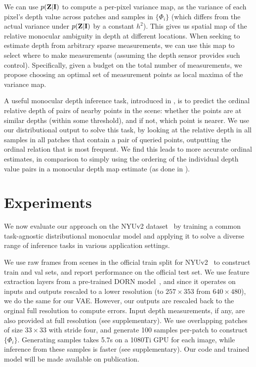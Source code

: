 \documentclass[10pt,twocolumn,letterpaper]{article}
\begin{document}
 We can use $p(\mathbf{Z}|\mathbf{I})$ to compute a per-pixel variance map,  as the variance of each pixel's depth value across patches and samples in $\{\Phi_i\}$ (which differs from the actual variance under $p(\mathbf{Z}|\mathbf{I})$ by a constant $h^2$). This gives us spatial map of the relative monocular ambiguity in depth at different locations. When seeking to estimate depth from arbitrary sparse measurements, we can use this map to select where to make measurements (assuming the depth sensor provides such control). Specifically, given a budget on the total number of measurements, we propose choosing an optimal set of measurement points as local maxima of the variance map.

 A useful monocular depth inference task, introduced in \cite{zoran2015learning}, is to predict the ordinal relative depth of pairs of nearby points in the scene: whether the points are at similar depths (within some threshold), and if not, which point is nearer. We use our distributional output to solve this task, by looking at the relative depth in all samples in all patches that contain a pair of queried points, outputting the ordinal relation that is most frequent. We find this leads to more accurate ordinal estimates, in comparison to simply using the ordering of the individual depth value pairs in a monocular depth map estimate (as done in \cite{chen2016single,zoran2015learning}). 

\section{Experiments}
\label{sec:apps}

We now evaluate our approach on the NYUv2 dataset~\cite{silberman2012indoor} by training a common task-agnostic distributional monocular model and applying it to solve a diverse range of inference tasks in various application settings.

 We use raw frames from scenes in the official train split for NYUv2~\cite{silberman2012indoor} to construct train and val sets, and report performance on the official test set. We use feature extraction layers from a pre-trained DORN model~\cite{fu2018deep}, and since it operates on inputs and outputs rescaled to a lower resolution (to $257\times 353$ from $640\times 480$), we do the same for our VAE. However, our outputs are rescaled back to the orginal full resolution to compute errors. Input depth measurements, if any, are also provided at full resolution (see supplementary). We use overlapping patches of size $33\times 33$ with stride four, and generate 100 samples per-patch to construct $\{\Phi_i\}$. Generating samples takes 5.7s on a 1080Ti GPU for each image, while inference from these samples is faster (see supplementary). Our code and trained model will be made available on publication.
\end{document}
